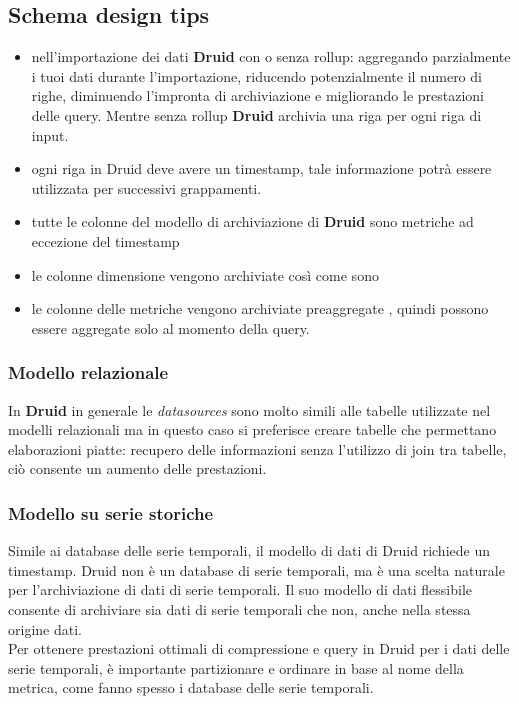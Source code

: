 \documentclass{article}
\begin{document}
\subsection{Schema design tips}
\begin{itemize}
   

 \item nell'importazione dei dati \textbf{Druid} con o senza rollup: aggregando parzialmente i tuoi dati durante l'importazione, riducendo potenzialmente il numero di righe, diminuendo l'impronta di archiviazione e migliorando le prestazioni delle query. Mentre senza rollup \textbf{Druid} archivia una riga per ogni riga di input.
 \item ogni riga in Druid deve avere un timestamp, tale informazione potrà essere utilizzata per successivi grappamenti.
 \item tutte le colonne del modello di archiviazione di     \textbf{Druid} sono metriche ad eccezione del timestamp
 \item le colonne dimensione vengono archiviate così come sono
 \item le colonne delle metriche vengono archiviate preaggregate , quindi possono essere aggregate solo al momento della query.
\end{itemize}
\subsubsection{Modello relazionale}
In \textbf{Druid} in generale le \textit{datasources} sono molto simili alle tabelle utilizzate nel modelli relazionali ma in questo caso si preferisce creare tabelle che permettano elaborazioni piatte: recupero delle informazioni senza l'utilizzo di join tra tabelle, ciò consente un aumento delle prestazioni.
\subsubsection{Modello su serie storiche}
Simile ai database delle serie temporali, il modello di dati di Druid richiede un timestamp. Druid non è un database di serie temporali, ma è una scelta naturale per l'archiviazione di dati di serie temporali. Il suo modello di dati flessibile consente di archiviare sia dati di serie temporali che non, anche nella stessa origine dati.\\
Per ottenere prestazioni ottimali di compressione e query in Druid per i dati delle serie temporali, è importante partizionare e ordinare in base al nome della metrica, come fanno spesso i database delle serie temporali.
\end{document}
